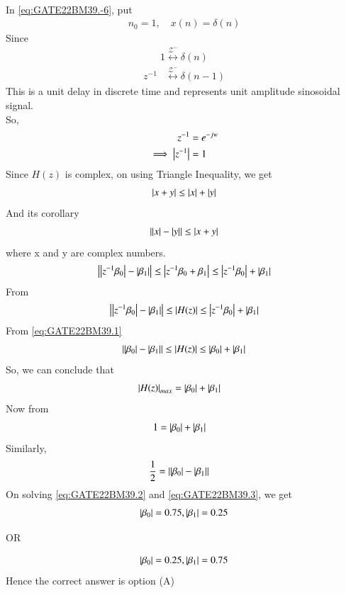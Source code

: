 \documentclass[journal,12pt,onecolumn]{IEEEtran}
\theoremstyle{remark}
\begin{document}
\\In \eqref{eq:GATE22BM39.-6}, put
\begin{align}
n_0 = 1, \quad x(n) = \delta(n) \nonumber 
\end{align}
Since
\begin{align}
1 \overset{\mathcal{Z^{-}}}{\longleftrightarrow} \delta(n) \nonumber
\end{align}
\begin{align}
z^{-1} &\overset{\mathcal{Z^{-}}}{\longleftrightarrow} \delta(n-1)
\end{align}
This is a unit delay in discrete time and represents unit amplitude sinosoidal signal.\\
So,
\begin{align}
z^{-1} &= e^{-jw} \\\implies
\abs{z^{-1}} &= 1 \label{eq:GATE22BM39.1}
\end{align}
Since $H(z)$ is complex, on using Triangle Inequality, we get
\begin{align}
\left\vert x + y\right\vert \leq \left\vert x\right\vert + \left\vert y\right\vert 
\end{align}
And its corollary
\begin{align}
\left\vert\left\vert x\right\vert-\left\vert y\right\vert\right\vert \leq \left\vert x + y\right\vert
\end{align}
where x and y are complex numbers.
\begin{align}
\left\vert\left\vert z^{-1}\beta_0\right\vert-\left\vert\beta_1\right\vert\right\vert \leq \left\vert z^{-1}\beta_0 + \beta_1\right\vert \leq \left\vert z^{-1}\beta_0\right\vert + \left\vert\beta_1\right\vert 
\end{align}
From 
\begin{align}
\left\vert\left\vert z^{-1}\beta_0\right\vert-\left\vert\beta_1\right\vert\right\vert \leq \left\vert H(z)\right\vert \leq \left\vert z^{-1}\beta_0\right\vert + \left\vert\beta_1\right\vert
\end{align}
From \eqref{eq:GATE22BM39.1} 
\begin{align}
\left\vert\left\vert\beta_0\right\vert-\left\vert\beta_1\right\vert\right\vert \leq \left\vert H(z)\right\vert \leq \left\vert\beta_0\right\vert + \left\vert\beta_1\right\vert 
\end{align}
So, we can conclude that
\begin{align}
\left\vert H(z)\right\vert_{max} &= \left\vert\beta_0\right\vert + \left\vert\beta_1\right\vert 
\end{align}
Now from 
\begin{align}
1 &= \abs{\beta_0} + \abs{\beta_1} \label {eq:GATE22BM39.2}
\end{align}
Similarly,
\begin{align}
\frac{1}{2} &= \abs{\abs{\beta_0}-\abs{\beta_1}} \label {eq:GATE22BM39.3}
\end{align}
On solving \eqref{eq:GATE22BM39.2} and \eqref{eq:GATE22BM39.3}, we get
\begin{align}
\left\vert\beta_0\right\vert = 0.75, \left\vert\beta_1\right\vert = 0.25 
\end{align}
\begin{center}
OR
\end{center}
\begin{align}
\left\vert\beta_0\right\vert = 0.25, \left\vert\beta_1\right\vert = 0.75 
\end{align}
Hence the correct answer is option (A) \\
\end{document}
